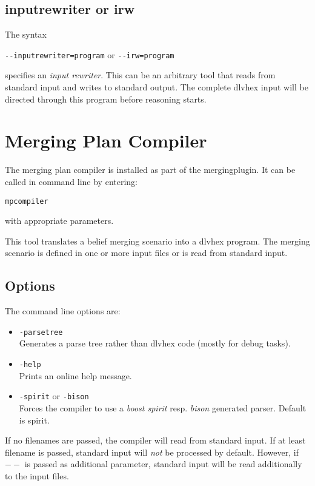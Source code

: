 \documentclass[a4paper,11pt]{article}
\theoremstyle{definition}
\newcommand{\dlvhex}{\textsf{dlvhex}\xspace }
\newcommand{\inlinecode}[1]{\textsf{#1}\xspace }
\begin{document}
			
		\subsection{\inlinecode{inputrewriter} or \inlinecode{irw}}

			The syntax
			\begin{center}
				\verb+--inputrewriter=program+ or \verb+--irw=program+
			\end{center}
			specifies an \emph{input rewriter}. This can be an arbitrary tool that reads from standard input and writes to standard output. The complete \dlvhex input will be
			directed through this program before reasoning starts.

			
	\section{Merging Plan Compiler}
	\label{sec:RPCompiler}
	
		The merging plan compiler is installed as part of the mergingplugin. It can be called in command line by entering:
		\begin{center}
			\verb+mpcompiler+
		\end{center}
		with appropriate parameters.

		This tool translates a belief merging scenario into a \dlvhex program. The merging scenario is defined in one or more input files or is read from standard input.
		

		\subsection{Options}
		\label{sec:RPCompiler:Options}

			The command line options are:
			\begin{itemize}
				\item \verb+-parsetree+ \\
						Generates a parse tree rather than dlvhex code (mostly for debug tasks).
				\item \verb+-help+ \\
						Prints an online help message.
				\item \verb+-spirit+ or \verb+-bison+ \\
						Forces the compiler to use a \emph{boost spirit} resp. \emph{bison} generated parser. Default is spirit.
			\end{itemize}

			If no filenames are passed, the compiler will read from standard input. If at least filename is passed, standard input will \emph{not} be processed by default.
			However, if $--$ is passed as additional parameter, standard input will be read additionally to the input files.
\end{document}
